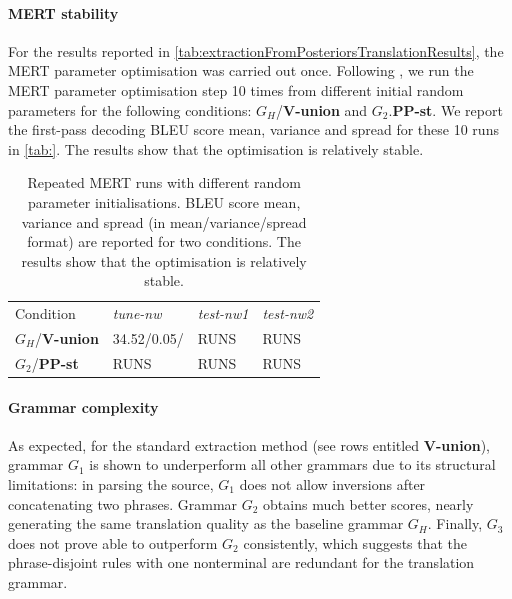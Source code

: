 
\paragraph{MERT stability}

For the results reported in \autoref{tab:extractionFromPosteriorsTranslationResults},
the MERT parameter optimisation was carried out once. Following
\citet{clark-dyer-lavie-smith:2011:ACL}, we run the MERT parameter optimisation
step 10 times from different initial random parameters for the following
conditions: $G_H$/\textbf{V-union} and $G_2$.\textbf{PP-st}. We report
the first-pass decoding BLEU score mean, variance and spread for these 10 runs in \autoref{tab:}.
The results show that the optimisation is relatively stable.
%
\begin{table}
  \begin{center}
    \begin{tabular}{*{4}{|l}|}
      Condition & \emph{tune-nw} & \emph{test-nw1} & \emph{test-nw2} \\
      $G_H$/\textbf{V-union} & 34.52/0.05/ & RUNS & RUNS \\
      $G_2$/\textbf{PP-st}   & RUNS & RUNS & RUNS \\
    \end{tabular}
  \end{center}
  \caption{Repeated MERT runs with different random parameter initialisations. BLEU
    score mean, variance and spread (in mean/variance/spread format) are reported for two conditions. The results show that
    the optimisation is relatively stable.}
  \label{tab:mertStability}
\end{table}

\paragraph{Grammar complexity}

As expected, for the standard extraction method (see
rows entitled {\bf V-union}), grammar $G_1$ is shown to underperform all other
grammars due to its structural limitations: in parsing the source, $G_1$
does not allow inversions after concatenating two phrases. %
Grammar $G_2$
obtains much better scores, nearly generating the same translation quality as
the baseline grammar $G_H$. Finally, $G_3$ does not prove able to outperform
$G_2$ consistently, which suggests that the phrase-disjoint rules with one nonterminal are
redundant for the translation grammar.
    
